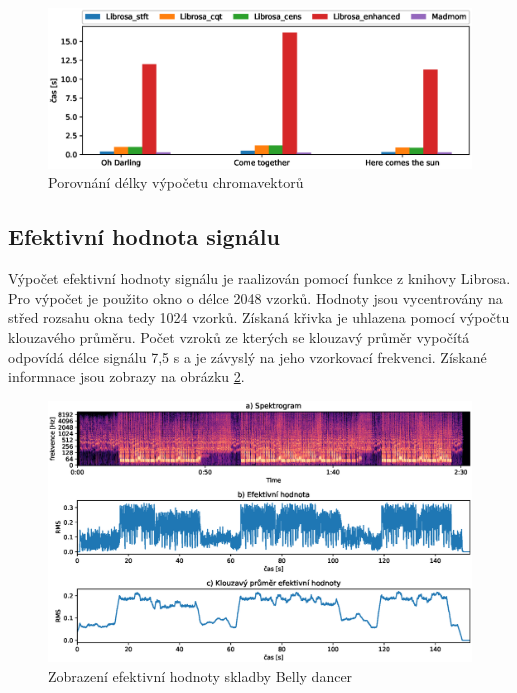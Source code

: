 \begin{figure}[H]
    \centering
    \includegraphics[width = 1\linewidth]{obrazky/Chroma_analysis_times_comparison.eps}
    \caption{Porovnání délky výpočetu chromavektorů}
    \label{fig:Chroma_calculation_time}
\end{figure}
    
\subsection{Efektivní hodnota signálu}

Výpočet efektivní hodnoty signálu je raalizován pomocí funkce z knihovy Librosa. Pro výpočet je použito okno o délce 2048 vzorků. Hodnoty jsou vycentrovány na střed rozsahu okna tedy 1024 vzorků. Získaná křivka je uhlazena pomocí výpočtu klouzavého průměru. Počet vzroků ze kterých se klouzavý průměr vypočítá odpovídá délce signálu 7,5 s a je závyslý na jeho vzorkovací frekvenci. Získané informnace jsou zobrazy na obrázku \ref{fig:RMS_calculation}.

\begin{figure}[H]
    \centering
    \includegraphics[width = 1\linewidth]{obrazky/Belly_dancer_RMS.eps}
    \caption{Zobrazení efektivní hodnoty skladby Belly dancer}
    \label{fig:RMS_calculation}
\end{figure}

